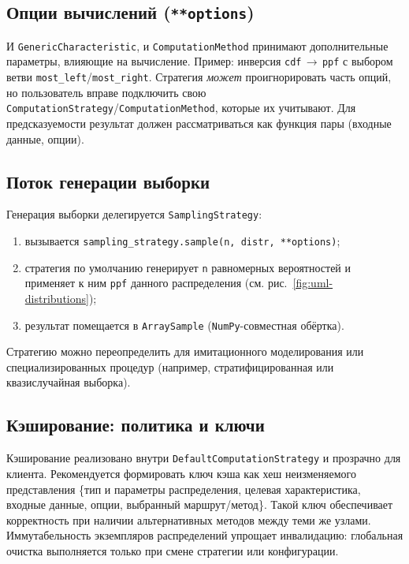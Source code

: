 \subsection{Опции вычислений (\texorpdfstring{\texttt{**options}}{**options})}

И \texttt{GenericCharacteristic}, и \texttt{ComputationMethod} принимают дополнительные параметры,
влияющие на вычисление. Пример: инверсия \texttt{cdf}\,$\to$\,\texttt{ppf} с выбором ветви
\texttt{most\_left}/\texttt{most\_right}. Стратегия \emph{может} проигнорировать часть опций,
но пользователь вправе подключить свою \texttt{ComputationStrategy}/\texttt{ComputationMethod},
которые их учитывают. Для предсказуемости результат должен рассматриваться как функция пары
(входные данные, опции).

\subsection{Поток генерации выборки}

Генерация выборки делегируется \texttt{SamplingStrategy}:
\begin{enumerate}
  \item вызывается \texttt{sampling\_strategy.sample(n, distr, **options)};
  \item стратегия по умолчанию генерирует \texttt{n} равномерных вероятностей и применяет к ним \texttt{ppf}
        данного распределения (см. рис.~\ref{fig:uml-distributions});
  \item результат помещается в \texttt{ArraySample} (\texttt{NumPy}-совместная обёртка).
\end{enumerate}
Стратегию можно переопределить для имитационного моделирования или специализированных процедур
(например, стратифицированная или квазислучайная выборка).

\subsection{Кэширование: политика и ключи}

Кэширование реализовано внутри \texttt{DefaultComputationStrategy} и прозрачно для клиента.
Рекомендуется формировать ключ кэша как хеш неизменяемого представления
\{тип и параметры распределения, целевая характеристика, входные данные, опции, выбранный маршрут/метод\}.
Такой ключ обеспечивает корректность при наличии альтернативных методов между теми же узлами.
Иммутабельность экземпляров распределений упрощает инвалидацию: глобальная очистка выполняется только
при смене стратегии или конфигурации.

